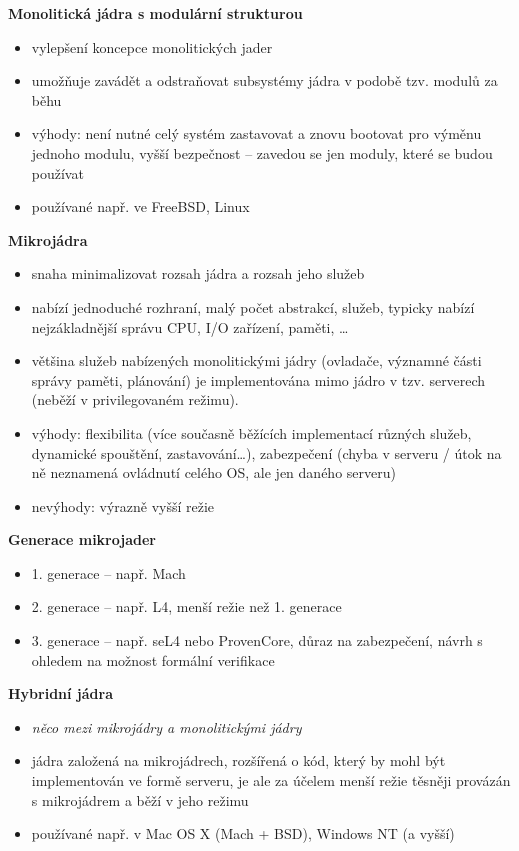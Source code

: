 \documentclass[a4paper, 11pt]{article}
\begin{document}
\textbf{Monolitická jádra s modulární strukturou}
\begin{itemize}
    \item vylepšení koncepce monolitických jader
    \item umožňuje zavádět a odstraňovat subsystémy jádra v podobě tzv. modulů za běhu
    \item výhody: není nutné celý systém zastavovat a znovu bootovat pro výměnu jednoho modulu, vyšší bezpečnost -- zavedou se jen moduly, které se budou používat
    \item používané např. ve FreeBSD, Linux
\end{itemize}

\textbf{Mikrojádra}
\begin{itemize}
    \item snaha minimalizovat rozsah jádra a rozsah jeho služeb
    \item nabízí jednoduché rozhraní, malý počet abstrakcí, služeb, typicky nabízí nejzákladnější správu CPU, I/O zařízení, paměti, \ldots
    \item většina služeb nabízených monolitickými jádry (ovladače, významné části správy paměti, plánování) je implementována mimo jádro v tzv. serverech (neběží v privilegovaném režimu).
    \item výhody: flexibilita (více současně běžících implementací různých služeb, dynamické spouštění, zastavování\ldots), zabezpečení (chyba v serveru / útok na ně neznamená ovládnutí celého OS, ale jen daného serveru)
    \item nevýhody: výrazně vyšší režie 
\end{itemize}

\textbf{Generace mikrojader}
\begin{itemize}
    \item 1. generace -- např. Mach
    \item 2. generace -- např. L4, menší režie než 1. generace
    \item 3. generace -- např. seL4 nebo ProvenCore, důraz na zabezpečení, návrh s ohledem na možnost formální verifikace
\end{itemize}

\textbf{Hybridní jádra}
\begin{itemize}
    \item \textit{něco mezi mikrojádry a monolitickými jádry}
    \item jádra založená na mikrojádrech, rozšířená o kód, který by mohl být implementován ve formě serveru, je ale za účelem menší režie těsněji provázán s mikrojádrem a běží v jeho režimu
    \item používané např. v Mac OS X (Mach + BSD), Windows NT (a vyšší)
\end{itemize}
\end{document}
